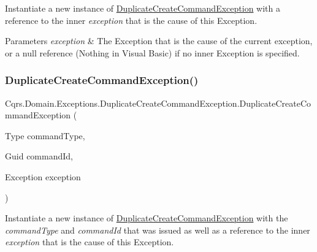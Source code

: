 Instantiate a new instance of \hyperlink{classCqrs_1_1Domain_1_1Exceptions_1_1DuplicateCreateCommandException}{Duplicate\+Create\+Command\+Exception} with a reference to the inner {\itshape exception}  that is the cause of this Exception. 


\begin{DoxyParams}{Parameters}
{\em exception} & The Exception that is the cause of the current exception, or a null reference (Nothing in Visual Basic) if no inner Exception is specified.\\
\hline
\end{DoxyParams}
\mbox{\label{classCqrs_1_1Domain_1_1Exceptions_1_1DuplicateCreateCommandException_a1781a01346ef9ed2619e8edacff00ba9_a1781a01346ef9ed2619e8edacff00ba9}} 
\subsubsection{\texorpdfstring{Duplicate\+Create\+Command\+Exception()}{DuplicateCreateCommandException()}\hspace{0.1cm}{\footnotesize\ttfamily [3/3]}}
{\footnotesize\ttfamily Cqrs.\+Domain.\+Exceptions.\+Duplicate\+Create\+Command\+Exception.\+Duplicate\+Create\+Command\+Exception (\begin{DoxyParamCaption}\item[{Type}]{command\+Type,  }\item[{Guid}]{command\+Id,  }\item[{Exception}]{exception }\end{DoxyParamCaption})}



Instantiate a new instance of \hyperlink{classCqrs_1_1Domain_1_1Exceptions_1_1DuplicateCreateCommandException}{Duplicate\+Create\+Command\+Exception} with the {\itshape command\+Type}  and {\itshape command\+Id}  that was issued as well as a reference to the inner {\itshape exception}  that is the cause of this Exception. 


